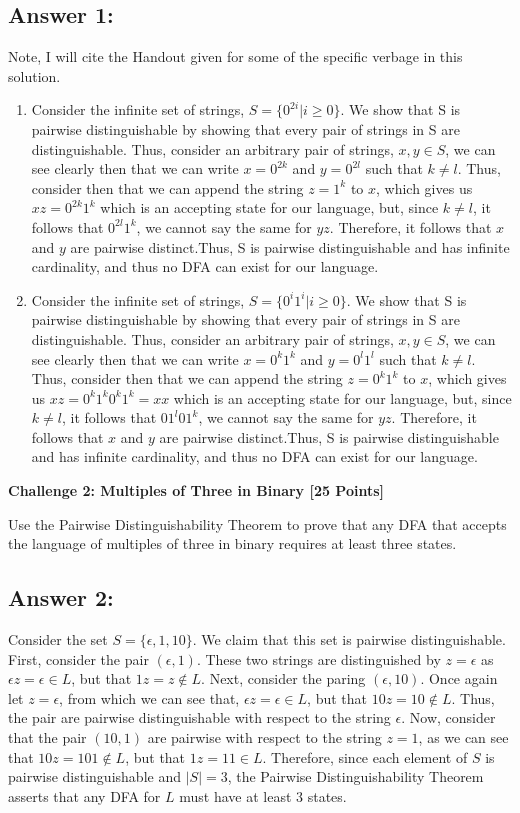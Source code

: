 \documentclass[12pt]{article}
\newcommand{\Problem}[3]{\mbox{} \newline \noindent \textbf{\textbf{Challenge #1: #2 [#3 Points] \\ }}}
\begin{document}
\subsection*{Answer 1:}
Note, I will cite the Handout given for some of the specific verbage in this solution.
\begin{enumerate}
	\item Consider the infinite set of strings, $S =\{0^{2i}| i \geq 0\}$. We show that S is pairwise distinguishable by showing that every pair of strings in S are distinguishable. Thus, consider an arbitrary pair of strings, $x, y \in S$, we can see clearly then that 
	we can write $x = 0^{2k}$ and $y = 0^{2l}$ such that $k \neq l$. Thus, consider then that we can append the string $z = 1^k$ to $x$, which gives us $xz = 0^{2k}1^k$ which is an accepting state for our language, but, since $k \neq l$, it follows that $0^{2l}1^k$, we cannot say the same for $yz$.
	Therefore, it follows that $x$ and $y$ are pairwise distinct.Thus, S is pairwise distinguishable and has
	infinite cardinality, and thus no DFA can exist for our language.
	\item Consider the infinite set of strings, $S =\{0^i1^{i}| i \geq 0\}$. We show that S is pairwise distinguishable by showing that every pair of strings in S are distinguishable. Thus, consider an arbitrary pair of strings, $x, y \in S$, we can see clearly then that 
	we can write $x = 0^k1^{k}$ and $y = 0^l1^{l}$ such that $k \neq l$. Thus, consider then that we can append the string $z = 0^k1^k$ to $x$, which gives us $xz = 0^k1^{k}0^k1^k = xx$ which is an accepting state for our language, but, since $k \neq l$, it follows that $01^{l}01^k$, we cannot say the same for $yz$.
	Therefore, it follows that $x$ and $y$ are pairwise distinct.Thus, S is pairwise distinguishable and has
	infinite cardinality, and thus no DFA can exist for our language.
\end{enumerate}

\Problem{2}{Multiples of Three in Binary}{25}

Use the Pairwise Distinguishability Theorem to prove that any DFA that accepts the language of multiples of three in binary requires at least three states. 

\subsection*{Answer 2:}
Consider the set $S = \{\epsilon, 1, 10\}$. We claim that this set is pairwise distinguishable. First, consider the pair $(\epsilon, 1)$. These two strings are distinguished by $z = \epsilon$ as $\epsilon z = \epsilon \in L$, but that $1z = z \not \in L$. Next, consider the paring $(\epsilon, 10)$. Once again let $z = \epsilon$, from which we can see that,
$\epsilon z = \epsilon \in L$, but that $10z = 10 \not \in L$. Thus, the pair are pairwise distinguishable with respect to the string $\epsilon$. Now, consider that the pair $(10, 1)$ are pairwise with respect to the string $z=1$, as we can see that $10z = 101 \not \in L$, but that $1z = 11 \in L$. Therefore, since each element of $S$ is pairwise distinguishable and $|S| =3$, the Pairwise Distinguishability Theorem asserts that
any DFA for $L$ must have at least 3 states.
\end{document}

